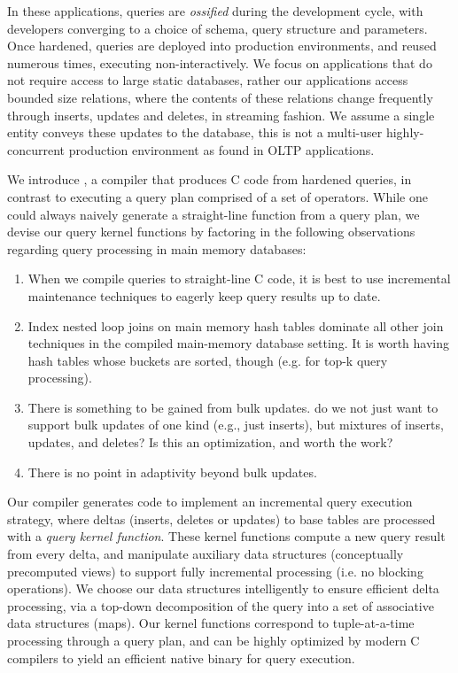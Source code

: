 In these applications, queries are \textit{ossified} during the development
cycle, with developers converging to a choice of schema, query structure and parameters.
Once hardened, queries are deployed into production environments, and reused
numerous times, executing non-interactively. We focus on applications that
do not require access to large static databases, rather our applications access bounded
size relations, where the contents of these relations change frequently through
inserts, updates and deletes, in streaming fashion. We assume a single entity
conveys these updates to the database, this is not a multi-user highly-concurrent
production environment as found in OLTP applications.
 
We introduce \compiler, a compiler that produces C code from hardened queries, in
contrast to executing a query plan comprised of a set of operators. 
While one could always naively generate a straight-line function from a query
plan, we devise our query kernel functions by factoring in the following
observations regarding query processing in main memory databases:

\begin{enumerate}
\item
When we compile queries to straight-line C code, it is best to use incremental
maintenance techniques to eagerly keep query results up to date.

\item
Index nested loop joins on main memory hash tables
dominate all other join techniques in the compiled
main-memory database setting.
It is worth having hash tables whose buckets are sorted, though (e.g. for
top-k query processing).

\item
There is something to be gained from bulk updates.
do we not just want to support bulk updates of one kind (e.g., just inserts),
but mixtures of inserts, updates, and deletes? Is this an optimization, and
worth the work?

\item
There is no point in adaptivity beyond bulk updates.
\end{enumerate}

Our compiler generates code to implement an incremental query execution strategy,
where deltas (inserts, deletes or updates) to base tables are processed with a
\textit{query kernel function}. These kernel functions compute a new query result
from every delta, and manipulate auxiliary data structures (conceptually
precomputed views) to support fully incremental processing (i.e. no blocking
operations). We choose our data structures intelligently to ensure efficient
delta processing, via a top-down decomposition of the query into a set of
associative data structures (maps). Our kernel functions correspond to
tuple-at-a-time processing through a query plan, and can be highly optimized by
modern C compilers to yield an efficient native binary for query execution.

